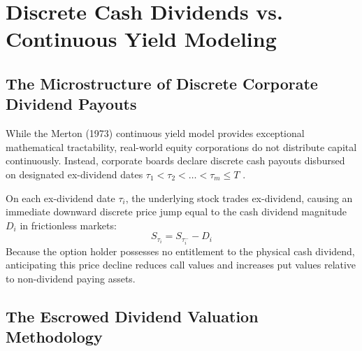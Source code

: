 
\section{Discrete Cash Dividends vs. Continuous Yield Modeling}
\label{sec:discrete_vs_continuous}

\subsection{The Microstructure of Discrete Corporate Dividend Payouts}

While the Merton (1973) continuous yield model provides exceptional mathematical tractability, real-world equity corporations do not distribute capital continuously. Instead, corporate boards declare discrete cash payouts disbursed on designated ex-dividend dates $\tau_1 < \tau_2 < \dots < \tau_m \le T$ \citep{wilmott2006paul}.

On each ex-dividend date $\tau_i$, the underlying stock trades ex-dividend, causing an immediate downward discrete price jump equal to the cash dividend magnitude $D_i$ in frictionless markets:
\begin{equation}
    S_{\tau_i} = S_{\tau_i^-} - D_i
    \label{eq:ex_div_drop}
\end{equation}
Because the option holder possesses no entitlement to the physical cash dividend, anticipating this price decline reduces call values and increases put values relative to non-dividend paying assets.

\subsection{The Escrowed Dividend Valuation Methodology}

